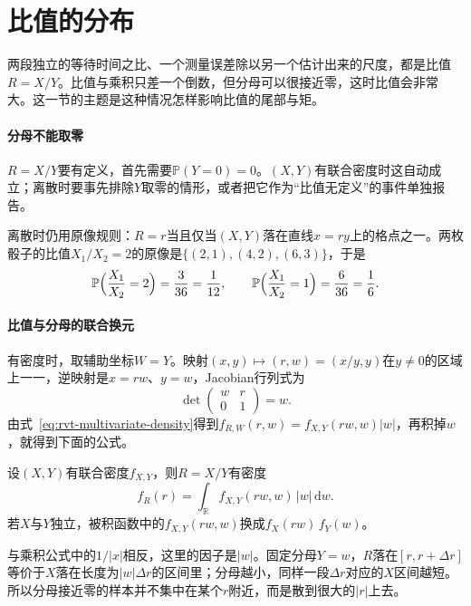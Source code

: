 \section{比值的分布}
\label{sec:rvt-ratios}

两段独立的等待时间之比、一个测量误差除以另一个估计出来的尺度，都是比值$R=X/Y$。比值与乘积只差一个倒数，但分母可以很接近零，这时比值会非常大。这一节的主题是这种情况怎样影响比值的尾部与矩。

\paragraph{分母不能取零}
$R=X/Y$要有定义，首先需要$\mathbb{P}(Y=0)=0$。$(X,Y)$有联合密度时这自动成立；离散时要事先排除$Y$取零的情形，或者把它作为“比值无定义”的事件单独报告。

离散时仍用原像规则：$R=r$当且仅当$(X,Y)$落在直线$x=ry$上的格点之一。两枚骰子的比值$X_1/X_2=2$的原像是$\{(2,1),(4,2),(6,3)\}$，于是
\[
 \mathbb{P}\Bigl(\frac{X_1}{X_2}=2\Bigr)=\frac{3}{36}=\frac1{12},\qquad \mathbb{P}\Bigl(\frac{X_1}{X_2}=1\Bigr)=\frac{6}{36}=\frac16 .
\]

\paragraph{比值与分母的联合换元}
有密度时，取辅助坐标$W=Y$。映射$(x,y)\mapsto(r,w)=(x/y,y)$在$y\neq0$的区域上一一，逆映射是$x=rw$、$y=w$，Jacobian行列式为
\[
 \det\begin{pmatrix}w&r\\0&1\end{pmatrix}=w .
\]
由式~\eqref{eq:rvt-multivariate-density}得到$f_{R,W}(r,w)=f_{X,Y}(rw,w)\lvert w\rvert$，再积掉$w$，就得到下面的公式。

\begin{theorem}[比值的密度]
\label{thm:rvt-ratio-density}
设$(X,Y)$有联合密度$f_{X,Y}$，则$R=X/Y$有密度
\begin{equation}
 f_R(r)=\int_{\mathbb{R}}f_{X,Y}(rw,w)\,\lvert w\rvert\,\mathrm{d}w .
 \label{eq:rvt-ratio-density}
\end{equation}
若$X$与$Y$独立，被积函数中的$f_{X,Y}(rw,w)$换成$f_X(rw)\,f_Y(w)$。
\end{theorem}

与乘积公式中的$1/\lvert x\rvert$相反，这里的因子是$\lvert w\rvert$。固定分母$Y=w$，$R$落在$[r,r+\Delta r]$等价于$X$落在长度为$\lvert w\rvert\Delta r$的区间里；分母越小，同样一段$\Delta r$对应的$X$区间越短。所以分母接近零的样本并不集中在某个$r$附近，而是散到很大的$\lvert r\rvert$上去。

